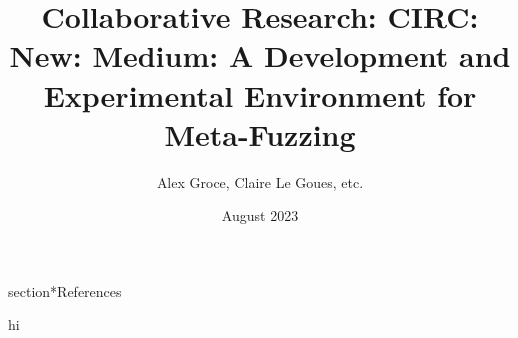 \documentclass[numbers]{proposalnsf}
\title{Collaborative Research: CIRC: New: Medium: A Development and 
Experimental Environment for Meta-Fuzzing}
\author{Alex Groce, Claire Le Goues, etc.}
\date{August 2023}
\newcommand{\cut}[1]{}
\begin{document}
\cut{
Cover Sheet
Project Summary
Table of Contents (automatically generated)
Project Description
References Cited
Biographical Sketch(es)
Budget and Budget Justification
Current and Pending Support
Facilities, Equipment and Other Resources
Data Management Plan
Postdoctoral Mentoring Plan (if applicable)
Collaborators & Other Affiliations Information
}


\newpage

\newpage
\tableofcontents
\newpage
{}
\setcounter{page}{1} 


%

section*{References}
\setcounter{page}{1}
%
%











hi
\end{document}
